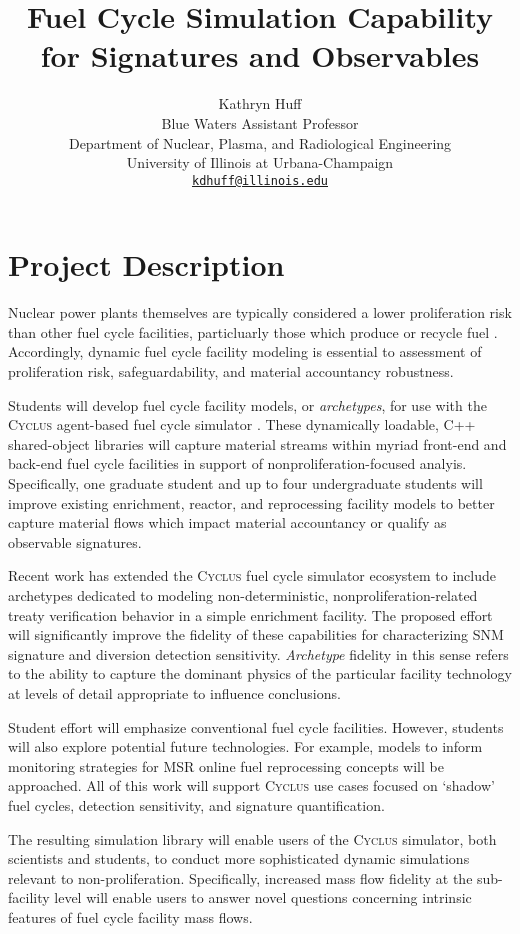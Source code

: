 \documentclass[letterpaper]{article}
\author{Kathryn Huff\\
        Blue Waters Assistant Professor\\
        Department of Nuclear, Plasma, and Radiological Engineering\\
        University of Illinois at Urbana-Champaign\\
         \href{mailto:kdhuff@illinois.edu}{\texttt{kdhuff@illinois.edu}}}
\title{Fuel Cycle Simulation Capability for Signatures and Observables}
\newcommand{\Cyclus}{\textsc{Cyclus}\xspace}%
\begin{document}
\maketitle
\section{Project Description}

Nuclear power plants themselves are typically considered a lower proliferation risk than other fuel cycle facilities, particluarly those which produce or recycle fuel \cite{sciences_america_2009}. Accordingly, dynamic fuel cycle facility modeling is essential to assessment of proliferation risk, safeguardability, and material accountancy robustness. 


Students will develop fuel cycle facility models, or \emph{archetypes}, for use with the \Cyclus agent-based fuel cycle simulator \cite{huff_fundamental_2016}. These dynamically loadable, C++ shared-object libraries will capture material streams within myriad front-end and back-end fuel cycle facilities in support of nonproliferation-focused analyis.  
Specifically, one graduate student and up to four undergraduate students will improve existing enrichment, reactor, and reprocessing facility models to better capture material flows which impact material accountancy or qualify as observable signatures. 

Recent work \cite{mcgarry_mbmore_2017} has extended the \Cyclus fuel cycle
simulator\cite{huff_fundamental_2016} ecosystem to include archetypes dedicated
to modeling non-deterministic, nonproliferation-related treaty verification
behavior in a simple enrichment facility. The proposed effort will
significantly improve the fidelity of these capabilities for characterizing
\gls{SNM} signature and diversion detection
sensitivity\cite{mcgarry_mbmore_2017}.  \emph{Archetype} fidelity in this sense
refers to the ability to capture the dominant physics of the particular
facility technology at levels of detail appropriate to influence conclusions.

Student effort will emphasize conventional fuel cycle facilities. However,
students will also explore potential future technologies. For example, models
to inform monitoring strategies for MSR online fuel reprocessing concepts will
be approached. All of this work will support \Cyclus use cases focused on
`shadow' fuel cycles\cite{shadow}, detection sensitivity\cite{mgarry}, and
signature quantification\cite{sigs}.

The resulting simulation library will enable users of the \Cyclus simulator,
both scientists and students, to conduct more sophisticated dynamic simulations
relevant to non-proliferation. Specifically, increased mass flow fidelity at
the sub-facility level will enable users to answer novel questions concerning
intrinsic features of fuel cycle facility mass flows.
\end{document}
